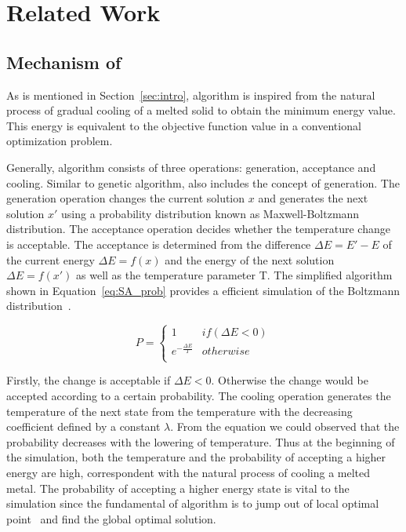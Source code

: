 \section{Related Work}
\label{sec:related}
\subsection{Mechanism of \SA}
As is mentioned in Section~\ref{sec:intro}, \SA algorithm is inspired from the natural process of gradual cooling of a melted solid to obtain the minimum energy value. This energy is equivalent to the objective function value in a conventional optimization problem.

Generally, \SA algorithm consists of three operations: generation, acceptance and cooling. Similar to genetic algorithm, \SA also includes the concept of generation. The generation operation changes the current solution $x$ and generates the next solution $x'$ using a probability distribution known as Maxwell-Boltzmann distribution. The acceptance operation decides whether the temperature change is acceptable. The acceptance is determined from the difference $\Delta E = E'-E$ of the current energy $\Delta E = f(x)$ and the energy of the next solution $\Delta E = f(x')$ as well as the temperature parameter T. The simplified algorithm shown in Equation~\ref{eq:SA_prob} provides a efficient simulation of the Boltzmann distribution~\cite{Hiroyasu:2010}.

\begin{equation}
\label{eq:SA_prob}
P=
\begin{cases}
1 & if(\Delta E < 0) \\
e^{-\frac{\Delta E}{T}}&otherwise \\
\end{cases}
\end{equation}

Firstly, the change is acceptable if $\Delta E < 0$. Otherwise the change would be accepted according to a certain probability. The cooling operation generates the temperature of the next state from the temperature with the decreasing coefficient defined by a constant $\lambda$. From the equation we could observed that the probability decreases with the lowering of temperature. Thus at the beginning of the simulation, both the temperature and the probability of accepting a higher energy are high, correspondent with the natural process of cooling a melted metal. The probability of accepting a higher energy state is vital to the \SA simulation since the fundamental of \SA algorithm is to jump out of local optimal point~\cite{Garcia:2009} and find the global optimal solution.
